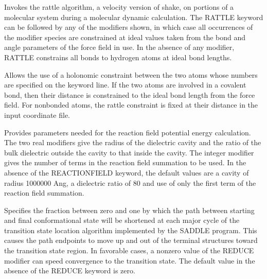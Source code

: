 \documentclass[letterpaper,11pt,english]{sphinxmanual}
\begin{document}
  Invokes the rattle algorithm, a velocity version of shake, on portions of a molecular system during a molecular dynamic calculation. The RATTLE keyword can be followed by any of the modifiers shown, in which case all occurrences of the modifier species are constrained at ideal values taken from the bond and angle parameters of the force field in use. In the absence of any modifier, RATTLE constrains all bonds to hydrogen atoms at ideal bond lengths.

  Allows the use of a holonomic constraint between the two atoms whose numbers are specified on the keyword line. If the two atoms are involved in a covalent bond, then their distance is constrained to the ideal bond length from the force field. For nonbonded atoms, the rattle constraint is fixed at their distance in the input coordinate file.





  Provides parameters needed for the reaction field potential energy calculation. The two real modifiers give the radius of the dielectric cavity and the ratio of the bulk dielectric outside the cavity to that inside the cavity. The integer modifier gives the number of terms in the reaction field summation to be used. In the absence of the REACTIONFIELD keyword, the default values are a cavity of radius 1000000 Ang, a dielectric ratio of 80 and use of only the first term of the reaction field summation.

  Specifies the fraction between zero and one by which the path between starting and final conformational state will be shortened at each major cycle of the transition state location algorithm implemented by the SADDLE program. This causes the path endpoints to move up and out of the terminal structures toward the transition state region. In favorable cases, a nonzero value of the REDUCE modifier can speed convergence to the transition state. The default value in the absence of the REDUCE keyword is zero.
\end{document}
